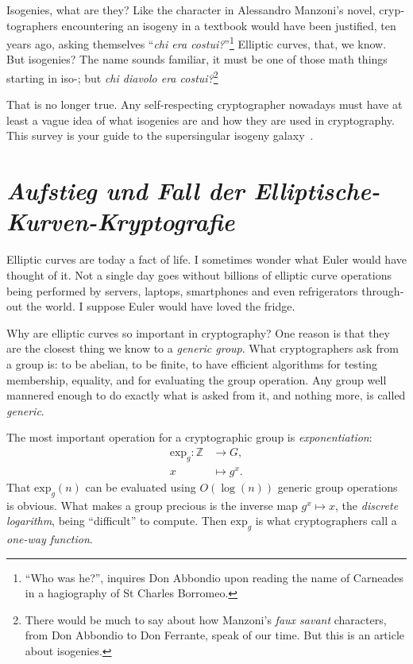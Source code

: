 \begin{otherlanguage}{english}
  \def\Z{\mathbb{Z}}
  \def\Q{\mathbb{Q}}
  \def\F{\mathbb{F}}
  \def\exp{\mathrm{exp}}
  \def\com{\mathcal{C}}
  \def\Gal{\mathrm{Gal}}
  \def\End{\mathrm{End}}
  \def\Ell{\mathrm{Ell}}
  \def\Cl{\mathrm{Cl}}
  \def\O{\mathcal{O}}
  
  Isogenies, what are they? Like the character in Alessandro Manzoni's
  novel, cryptographers encountering an isogeny in a textbook would
  have been justified, ten years ago, asking themselves ``\textit{chi
    era costui?}''\footnote{``Who was he?'', inquires Don Abbondio
    upon reading the name of Carneades in a hagiography of St Charles
    Borromeo.} Elliptic curves, that, we know. But isogenies?  The
  name sounds familiar, it must be one of those math things starting
  in iso-; but \textit{chi diavolo era costui?}\footnote{There would
    be much to say about how Manzoni's \textit{faux savant}
    characters, from Don Abbondio to Don Ferrante, speak of our
    time. But this is an article about isogenies.}

  That is no longer true. Any self-respecting cryptographer nowadays
  must have at least a vague idea of what isogenies are and how they
  are used in cryptography. This survey is your guide to the
  supersingular isogeny galaxy~\cite{galaxy}.

  \section{\textit{Aufstieg und Fall der Elliptische-Kurven-Kryptografie}}
  Elliptic curves are today a fact of life.  I sometimes wonder what
  Euler would have thought of it.  Not a single day goes without
  billions of elliptic curve operations being performed by servers,
  laptops, smartphones and even refrigerators throughout the world. I
  suppose Euler would have loved the fridge.

  Why are elliptic curves so important in cryptography? One reason is
  that they are the closest thing we know to a \emph{generic
    group}. What cryptographers ask from a group is: to be abelian, to
  be finite, to have efficient algorithms for testing membership,
  equality, and for evaluating the group operation. Any group well
  mannered enough to do exactly what is asked from it, and nothing
  more, is called \emph{generic}.

  The most important operation for a cryptographic group is
  \emph{exponentiation}:
  \begin{align*}
    \exp_g : \Z &\to G,\\
    x &\mapsto g^x.
  \end{align*}
  That $\exp_g(n)$ can be evaluated using $O(\log(n))$ generic group
  operations is obvious. What makes a group precious is the inverse
  map $g^x\mapsto x$, the \emph{discrete logarithm}, being
  ``difficult'' to compute. Then $\exp_g$ is what cryptographers call
  a \emph{one-way function}.


\end{otherlanguage}
